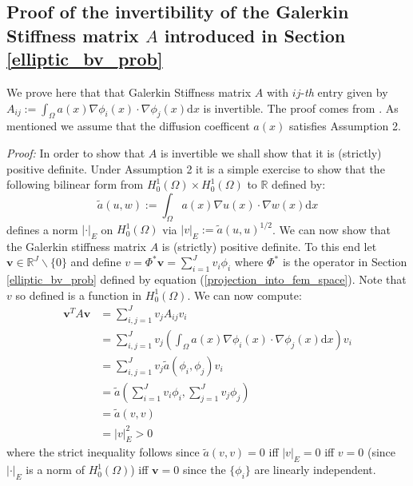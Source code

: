 \subsection{Proof of the invertibility of the Galerkin Stiffness matrix $A$ introduced in Section \textcolor{blue}{\ref{elliptic_bv_prob}}}

We prove here that that Galerkin Stiffness matrix $A$ with $ij$-\textit{th} entry given by $A_{ij}:=\int_{\Omega}a(x)\nabla\phi_{i}(x)\cdot\nabla\phi_{j}(x)\mathrm{d}x$ is invertible. The proof comes from \textcolor{blue}{\cite{lord2014introduction}}. As mentioned we assume that the diffusion coefficent $a(x)$ satisfies Assumption 2.

\noindent \textit{Proof:} In order to show that $A$ is invertible we shall show that it is (strictly) positive definite. Under Assumption 2 it is a simple exercise to show that the following bilinear form from $H_{0}^{1}(\Omega)\times H_{0}^{1}(\Omega)$ to $\mathbb{R}$ defined by:
\begin{equation}
    \tilde{a}(u,w):=\int_{\Omega}a(x)\nabla u(x)\cdot\nabla w(x)\mathrm{d}x
\end{equation}
defines a norm $|\boldsymbol{\cdot}|_{E}$ on $H_{0}^{1}(\Omega)$ via $|v|_{E}:=\tilde{a}(u,u)^{1/2}$. We can now show that the Galerkin stiffness matrix $A$ is (strictly) positive definite. To this end let $\mathbf{v}\in\mathbb{R}^{J}\backslash\{0\}$ and define $v=\Phi^{*}\mathbf{v}=\sum_{i=1}^{J}v_{i}\phi_{i}$ where $\Phi^{*}$ is the operator in Section \textcolor{blue}{\ref{elliptic_bv_prob}} defined by equation (\ref{projection_into_fem_space}). Note that $v$ so defined is a function in $H_{0}^{1}(\Omega)$. We can now compute:
\begin{align*}
    \mathbf{v}^{T}A\mathbf{v} &= \sum_{i,j=1}^{J}v_{j}A_{ij}v_{i} \\
    &=\sum_{i,j=1}^{J}v_{j}(\int_{\Omega}a(x)\nabla\phi_{i}(x)\cdot\nabla\phi_{j}(x)\mathrm{d}x)v_{i} \\
    &=\sum_{i,j=1}^{J}v_{j}\tilde{a}(\phi_{i},\phi_{j})v_{i} \\
    &=\tilde{a}\left(\sum_{i=1}^{J}v_{i}\phi_{i},\sum_{j=1}^{J}v_{j}\phi_{j}\right) \\
    &= \tilde{a}(v,v) \\
    &= |v|_{E}^{2}>0
\end{align*}
where the strict inequality follows since $\tilde{a}(v,v)=0$ iff $|v|_{E}=0$ iff $v=0$ (since $|\boldsymbol{\cdot}|_{E}$ is a norm of $H_{0}^{1}(\Omega)$) iff $\mathbf{v}=0$ since the $\{\phi_{i}\}$ are linearly independent. \qedsymbol

